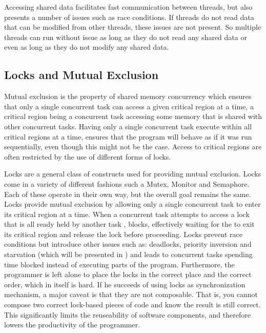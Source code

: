 Accessing shared data facilitates fast communication between threads, but also presents a number of issues such as race conditions. If threads do not read data that can be modified from other threads, these issues are not present. So multiple threads can run without issue as long as they do not read any shared data or even as long as they do not modify any shared data.


\subsection{Locks and Mutual Exclusion}\label{sec:locks_me}
Mutual exclusion is the property of shared memory concurrency which ensures that only a single concurrent task can access a given critical region at a time\cite[p. 117]{tanenbaum2008modern}\cite[p. 962]{bryant2011computer}, a critical region being a concurrent task accessing some memory that is shared with other concurrent tasks\cite[p. 117]{tanenbaum2008modern}\cite[p. 961]{bryant2011computer}. Having only a single concurrent task execute within all critical regions at a time, ensures that the program will behave as if it was run sequentially, even though this might not be the case. Access to critical regions are often restricted by the use of different forms of locks\cite[p. 58]{sutter2005software}. 

Locks are a general class of constructs used for providing mutual exclusion. Locks come in a variety of different fashions such a Mutex, Monitor and Semaphore. Each of these operate in their own way, but the overall goal remains the same. Locks provide mutual exclusion by allowing only a single concurrent task to enter its critical region at a time. When a concurrent task  attempts to access a lock that is all ready held by another task , blocks, effectively waiting for the  to exit its critical region and release the lock before proceeding. Locks prevent race conditions but introduce other issues such as: deadlocks, priority inversion and starvation (which will be presented in ) and leads to concurrent tasks spending time blocked instead of executing parts of the program. Furthermore, the programmer is left alone to place the locks in the correct place and the correct order, which in itself is hard. If he succeeds of using locks as synchronization mechanism, a major caveat is that they are not composable\cite[p. 58]{sutter2005software}. That is, you cannot compose two correct lock-based pieces of code and know the result is still correct. This significantly limits the reuseability of software components, and therefore lowers the productivity of the programmer.

